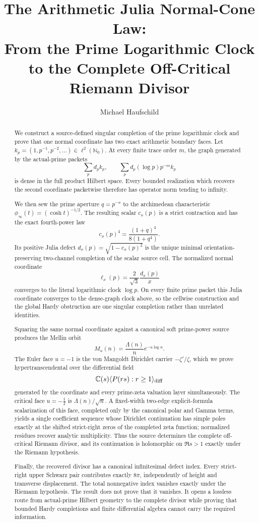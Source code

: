 \documentclass[11pt]{article}
\title{The Arithmetic Julia Normal-Cone Law:\\
From the Prime Logarithmic Clock to the Complete Off-Critical Riemann Divisor}
\author{Michael Haufschild}
\date{}
\theoremstyle{definition}
\theoremstyle{remark}
\newcommand{\C}{\mathbb C}
\newcommand{\N}{\mathbb N}
\begin{document}
\maketitle

\begin{abstract}
We construct a source-defined singular completion of the prime logarithmic clock and prove that
one normal coordinate has two exact arithmetic boundary faces.  Let
\(k_p=(1,p^{-1},p^{-2},\ldots)\in\ell^2(\N_0)\).  At every finite trace order \(m\), the graph
generated by the actual-prime packets
\[
 \sum_p d_pk_p,\qquad
 \sum_p d_p(\log p)p^{-m}k_p
\]
is dense in the full product Hilbert space.  Every bounded realization which recovers the second
coordinate packetwise therefore has operator norm tending to infinity.

We then sew the prime aperture \(q=p^{-x}\) to the archimedean characteristic
\(\phi_\infty(t)=(\cosh t)^{-1/2}\).  The resulting scalar \(c_x(p)\) is a strict contraction and
has the exact fourth-power law
\[
 c_x(p)^4=\frac{(1+q)^4}{8(1+q^4)}.
\]
Its positive Julia defect \(d_x(p)=\sqrt{1-c_x(p)^2}\) is the unique minimal
orientation-preserving two-channel completion of the scalar source cell.  The normalized normal
coordinate
\[
 \ell_x(p)=\frac{2}{\sqrt3}\frac{d_x(p)}x
\]
converges to the literal logarithmic clock \(\log p\).  On every finite prime packet this Julia
coordinate converges to the dense-graph clock above, so the cellwise construction and the global
Hardy obstruction are one singular completion rather than unrelated identities.

Squaring the same normal coordinate against a canonical soft prime-power source produces the
Mellin orbit
\[
 M_u(n)=\frac{\Lambda(n)}n e^{-u\log n}.
\]
The Euler face \(u=-1\) is the von Mangoldt Dirichlet carrier
\(-\zeta'/\zeta\), which we prove hypertranscendental over the differential field
\[
 \C(s)\langle P(rs):r\ge1\rangle_{\rm diff}
\]
generated by the coordinate and every prime-zeta valuation layer simultaneously.  The critical
face \(u=-\tfrac12\) is \(\Lambda(n)/\sqrt n\).  A fixed-width two-edge explicit-formula
scalarization of this face, completed only by the canonical polar and Gamma terms, yields a
single coefficient sequence whose Dirichlet continuation has simple poles exactly at the
shifted strict-right zeros of the completed zeta function; normalized residues recover analytic
multiplicity.  Thus the source determines the complete off-critical Riemann divisor, and its
continuation is holomorphic on \(\Re s>1\) exactly under the Riemann hypothesis.

Finally, the recovered divisor has a canonical infinitesimal defect index.  Every strict-right
upper Schwarz pair contributes exactly \(8\pi\), independently of height and transverse
displacement.  The total nonnegative index vanishes exactly under the Riemann hypothesis.  The
result does not prove that it vanishes.  It opens a lossless route from actual-prime Hilbert
geometry to the complete divisor while proving that bounded Hardy completions and finite
differential algebra cannot carry the required information.
\end{abstract}
\end{document}
